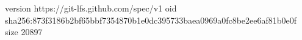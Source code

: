 version https://git-lfs.github.com/spec/v1
oid sha256:873f3186b2bf65bbf7354870b1e0dc395733baea0969a0fc8be2ee6af81b0e0f
size 20897
